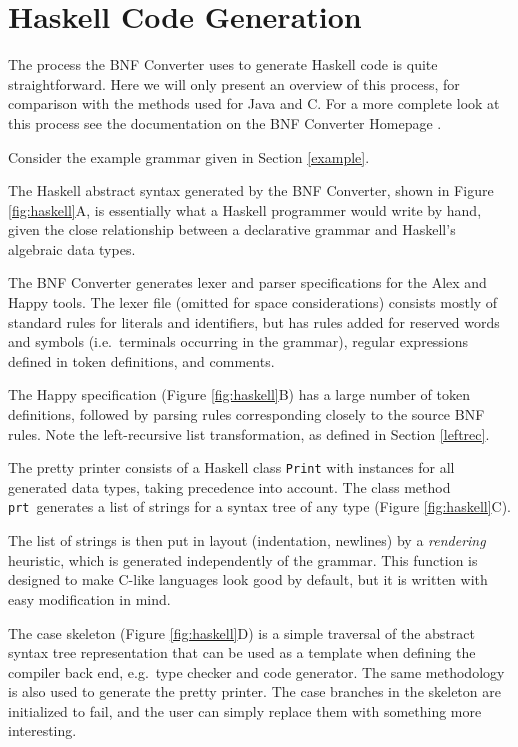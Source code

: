 \section{Haskell Code Generation}

The process the BNF Converter uses to generate Haskell code is quite straightforward. Here we will only present an overview of this process, for comparison with the methods used for Java and C. For a more complete look at this process see the documentation on the BNF Converter Homepage \cite{bnfcsite}.


Consider the example grammar given in Section \ref{example}.

The Haskell abstract syntax generated by the
BNF Converter, shown in Figure \ref{fig:haskell}A, is essentially what a Haskell programmer would write by hand, given the close relationship between a declarative grammar and Haskell's algebraic data types.


The BNF Converter generates lexer and parser specifications for the Alex \cite{alex} and Happy \cite{happy} tools. The lexer file (omitted for space considerations) consists mostly of standard rules for literals and identifiers, but has
rules added for reserved words and symbols (i.e.\ terminals 
occurring in the grammar), regular expressions defined in token definitions, and comments. 

The Happy specification (Figure \ref{fig:haskell}B) has a large number of token definitions,
followed by parsing rules corresponding closely to the source BNF rules. Note the left-recursive list transformation, as defined in Section \ref{leftrec}.


The pretty printer consists of a Haskell class {\tt Print} with instances
for all generated data types, taking precedence into account. The class method
{\tt prt}\
generates a list of strings for a syntax tree of any type (Figure \ref{fig:haskell}C).

The list of strings is then put in layout (indentation, newlines) by a \textit{rendering}
heuristic, which is generated independently of the grammar. This function is designed to make C-like languages look good by default, but it is written with easy modification in mind.

The case skeleton (Figure \ref{fig:haskell}D) is a simple traversal of the abstract syntax tree representation that can be used as a template when defining the compiler
back end, e.g.\ type checker and code generator. The same methodology is
also used to generate the pretty printer. The case branches in the skeleton
are initialized to fail, and the user can simply replace them with something more interesting.

